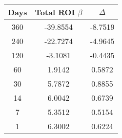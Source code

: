 \begin{tabular}{||c c c||}
\hline
Days & Total ROI $\beta$ & $\Delta$ \\
\hline\hline
360 & -39.8554 & -8.7519 \\
240 & -22.7274 & -4.9645 \\
120 & -3.1081 & -0.4435 \\
60 & 1.9142 & 0.5872 \\
30 & 5.7872 & 0.8855 \\
14 & 6.0042 & 0.6739 \\
7 & 5.3512 & 0.5154 \\
1 & 6.3002 & 0.6224 \\
\hline
\end{tabular}
